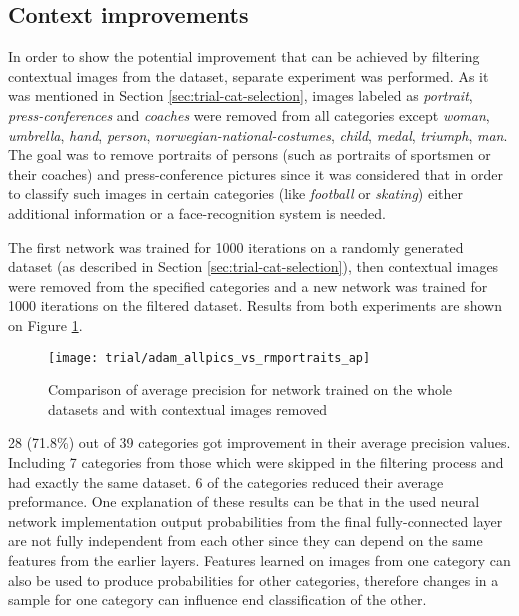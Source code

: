 \subsection{Context improvements}
    In order to show the potential improvement that can be achieved by filtering contextual images from the dataset, separate experiment was performed. As it was mentioned in Section \ref{sec:trial-cat-selection}, images labeled as \textit{portrait}, \textit{press-conferences} and \textit{coaches} were removed from all categories except \textit{woman}, \textit{umbrella}, \textit{hand}, \textit{person}, \textit{norwegian-national-costumes}, \textit{child}, \textit{medal}, \textit{triumph}, \textit{man}. The goal was to remove portraits of persons (such as portraits of sportsmen or their coaches) and press-conference pictures since it was considered that in order to classify such images in certain categories (like \textit{football} or \textit{skating}) either additional information or a face-recognition system is needed.
    
    The first network was trained for 1000 iterations on a randomly generated dataset (as described in Section \ref{sec:trial-cat-selection}), then contextual images were removed from the specified categories and a new network was trained for 1000 iterations on the filtered dataset. Results from both experiments are shown on Figure \ref{fig:trial-allpics-vs-rmportraits}.
    
    \begin{figure}[H]
        \centering
        \texttt{[image: trial/adam\_allpics\_vs\_rmportraits\_ap]}
        \caption[Trial experiment. Average precision for all images vs contextual removed]{Comparison of average precision for network trained on the whole datasets and with contextual images removed}
        \label{fig:trial-allpics-vs-rmportraits}
    \end{figure}
    
    28 (71.8\%) out of 39 categories got improvement in their average precision values. Including 7 categories from those which were skipped in the filtering process and had exactly the same dataset. 6 of the categories reduced their average preformance. One explanation of these results can be that in the used neural network implementation output probabilities from the final fully-connected layer are not fully independent from each other since they can depend on the same features from the earlier layers. Features learned on images from one category can also be used to produce probabilities for other categories, therefore changes in a sample for one category can influence end classification of the other.
    
